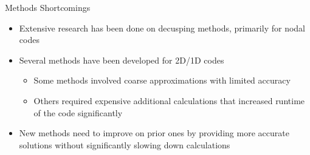 \begin{frame}[t]{Methods Shortcomings}
    
    \begin{itemize}
        \item Extensive research has been done on decusping methods, primarily for nodal codes
        \item Several methods have been developed for 2D/1D codes
        \begin{itemize}
            \item Some methods involved coarse approximations with limited accuracy
            \item Others required expensive additional calculations that increased runtime of the code significantly
        \end{itemize}
        \item New methods need to improve on prior ones by providing more accurate solutions without significantly slowing down calculations
    \end{itemize}

\end{frame}